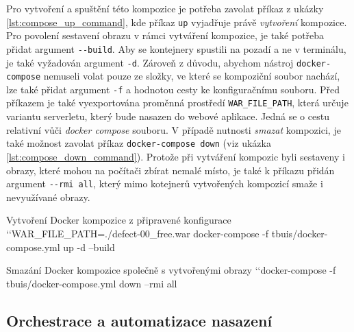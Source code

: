 \documentclass[czech, ma, kiv, he, iso690numb, pdf, viewonly]{fasthesis}
\begin{document}
    Pro vytvoření a spuštění této kompozice je potřeba zavolat příkaz z ukázky \ref{lst:compose_up_command}, kde příkaz \verb|up| vyjadřuje právě \textit{vytvoření} kompozice. Pro povolení sestavení obrazu v rámci vytváření kompozice, je také potřeba přidat argument \verb|--build|. Aby se kontejnery spustili na pozadí a ne v terminálu, je také vyžadován argument \verb|-d|. Zároveň z důvodu, abychom nástroj \verb|docker-compose| nemuseli volat pouze ze složky, ve které se kompoziční soubor nachází, lze také přidat argument \verb|-f| a hodnotou cesty ke konfiguračnímu souboru. Před příkazem je také vyexportována proměnná prostředí \verb|WAR_FILE_PATH|, která určuje variantu serverletu, který bude nasazen do webové aplikace. Jedná se o cestu relativní vůči \textit{docker compose} souboru. V případě nutnosti \textit{smazat} kompozici, je také možnost zavolat příkaz \verb|docker-compose down| (viz ukázka \ref{lst:compose_down_command}). Protože při vytváření kompozic byli sestaveny i obrazy, které mohou na počítači zbírat nemalé místo, je také k příkazu přidán argument \verb|--rmi all|, který mimo kotejnerů vytvořených kompozicí smaže i nevyužívané obrazy.

    \begin{console}{Vytvoření Docker kompozice z připravené konfigurace \label{lst:compose_up_command}}
`\uxprompt`WAR_FILE_PATH=./defect-00_free.war docker-compose -f tbuis/docker-compose.yml up -d --build
    \end{console}

    \begin{console}{Smazání Docker kompozice společně s vytvořenými obrazy \label{lst:compose_down_command}}
`\uxprompt`docker-compose -f tbuis/docker-compose.yml down --rmi all
    \end{console}

    \subsection{Orchestrace a automatizace nasazení} \label{sec:orchestration}
\end{document}
